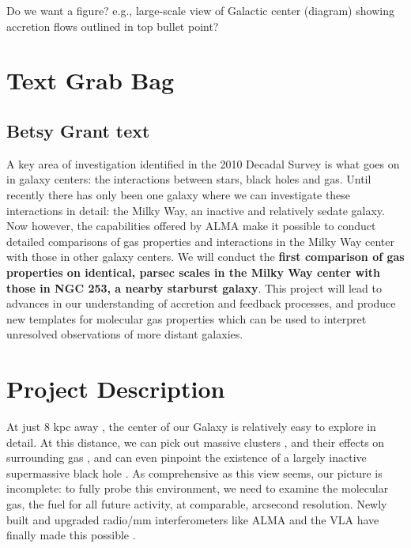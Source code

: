 \documentclass{aastex62}
\begin{document}
Do we want a figure?  e.g., large-scale view of Galactic center (diagram) showing accretion flows outlined in top bullet point? \\


\section{Text Grab Bag}

\subsection{Betsy Grant text}
 A key area of investigation identified in the 2010 Decadal Survey is what goes on in galaxy centers: the interactions between stars, black holes and gas. Until recently there has only been one galaxy where we can investigate these interactions in detail: the Milky Way, an inactive and relatively sedate galaxy. Now however, the capabilities offered by ALMA make it possible to conduct detailed comparisons of gas properties and interactions in the Milky Way center with those in other galaxy centers. We will conduct the {\bf first comparison of gas properties on identical, parsec scales in the Milky Way center with those in NGC 253, a nearby starburst galaxy}. This project will lead to advances in our understanding of accretion and feedback processes, and produce new templates for molecular gas properties which can be used to interpret unresolved observations of more distant galaxies. 
\section{Project Description}  

At just 8 kpc away \citep{Boehle16}, the center of our Galaxy is relatively easy to explore in detail. At this distance, we can pick out massive clusters \citep{Clarkson12,Hussmann12,Lu13}, and their effects on surrounding gas \citep{Lang97,Lang01}, and can even pinpoint the existence of a largely inactive supermassive black hole \citep{Genzel96,Genzel97,Ghez98,Ghez08}. As comprehensive as this view seems, our picture is incomplete: to fully probe this environment, we need to examine the molecular gas, the fuel for all future activity, at comparable, arcsecond resolution. Newly built and upgraded radio/mm interferometers like ALMA and the VLA have finally made this possible \citep[e.g.,][]{Mills15, Rathborne15, Battersby17}. 
\end{document}
